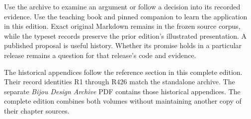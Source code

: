 Use the archive to examine an argument or follow a decision into its recorded evidence. Use the teaching book and pinned companion to learn the application in this edition. Exact original Markdown remains in the frozen source corpus, while the typeset records preserve the prior edition's illustrated presentation. A published proposal is useful history. Whether its promise holds in a particular release remains a question for that release's code and evidence.

\ifBookArchive
The historical appendices follow the reference section in this complete edition. Their record identities R1 through R426 match the standalone archive.
\else
The separate \textit{Bijou Design Archive} PDF contains those historical appendices. The complete edition combines both volumes without maintaining another copy of their chapter sources.
\fi
